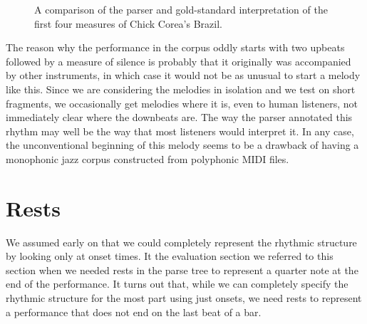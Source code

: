 \begin{figure}
\centering
{}

\caption{A comparison of the parser and gold-standard interpretation of the first four measures of Chick Corea's Brazil.}
\label{fig:brazil}
\end{figure}

The reason why the performance in the corpus oddly starts with two upbeats followed by a measure of silence is probably that it originally was accompanied by other instruments, in which case it would not be as unusual to start a melody like this. Since we are considering the melodies in isolation and we test on short fragments, we occasionally get melodies where it is, even to human listeners, not immediately clear where the downbeats are. The way the parser annotated this rhythm may well be the way that most listeners would interpret it. In any case, the unconventional beginning of this melody seems to be a drawback of having a monophonic jazz corpus constructed from polyphonic MIDI files.

\section{Rests}
\label{sec:rests}

We assumed early on that we could completely represent the rhythmic structure by looking only at onset times. It the evaluation section we referred to this section when we needed rests in the parse tree to represent a quarter note at the end of the performance. It turns out that, while we can completely specify the rhythmic structure for the most part using just onsets, we need rests to represent a performance that does not end on the last beat of a bar. 

